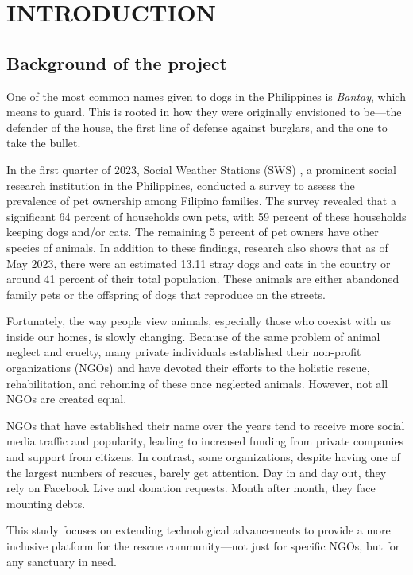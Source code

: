 \section{INTRODUCTION}
    \subsection{Background of the project}

            One of the most common names given to dogs in the Philippines is \textit{Bantay}, which means to guard. This is rooted in how they were originally envisioned to be—the defender of the house, the first line of defense against burglars, and the one to take the bullet.

            In the first quarter of 2023, Social Weather Stations (SWS) , a prominent social research institution in the Philippines, conducted a survey to assess the prevalence of pet ownership among Filipino families. The survey revealed that a significant 64 percent of households own pets, with 59 percent of these households keeping dogs and/or cats. The remaining 5 percent of pet owners have other species of animals\citep{SwsHouseholdPet2023}. In addition to these findings, research also shows that as of May 2023, there were an estimated 13.11 stray dogs and cats in the country or around 41 percent of their total population\citep{Overpopulation2024}. These animals are either abandoned family pets or the offspring of dogs that reproduce on the streets.
            
            Fortunately, the way people view animals, especially those who coexist with us inside our homes, is slowly changing. Because of the same problem of animal neglect and cruelty, many private individuals established their non-profit organizations (NGOs) and have devoted their efforts to the holistic rescue, rehabilitation, and rehoming of these once neglected animals. However, not all NGOs are created equal.
            
            NGOs that have established their name over the years tend to receive more social media traffic and popularity, leading to increased funding from private companies and support from citizens. In contrast, some organizations, despite having one of the largest numbers of rescues, barely get attention. Day in and day out, they rely on Facebook Live and donation requests. Month after month, they face mounting debts.
            
            This study focuses on extending technological advancements to provide a more inclusive platform for the rescue community—not just for specific NGOs, but for any sanctuary in need.

